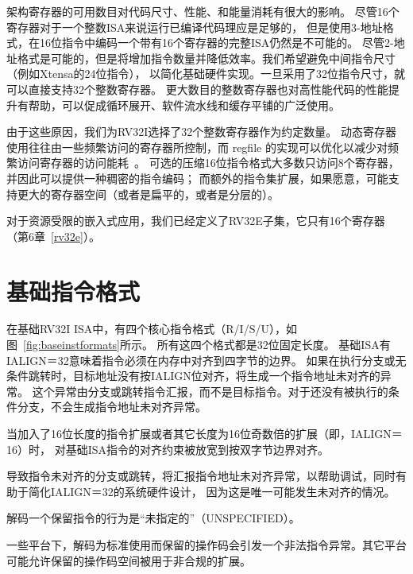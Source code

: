 \begin{commentary}

  架构寄存器的可用数目对代码尺寸、性能、和能量消耗有很大的影响。
  尽管16个寄存器对于一个整数ISA来说运行已编译代码理应是足够的，
  但是使用3-地址格式，在16位指令中编码一个带有16个寄存器的完整ISA仍然是不可能的。
  尽管2-地址格式是可能的，但是将增加指令数量并降低效率。我们希望避免中间指令尺寸（例如Xtensa的24位指令），
  以简化基础硬件实现。一旦采用了32位指令尺寸，就可以直接支持32个整数寄存器。
  更大数目的整数寄存器也对高性能代码的性能提升有帮助，可以促成循环展开、软件流水线和缓存平铺的广泛使用。

  由于这些原因，我们为RV32I选择了32个整数寄存器作为约定数量。
  动态寄存器使用往往由一些频繁访问的寄存器所控制，而 regfile 的实现可以优化以减少对频繁访问寄存器的访问能耗~\cite{jtseng:sbbci}。
  可选的压缩16位指令格式大多数只访问8个寄存器，并因此可以提供一种稠密的指令编码；
  而额外的指令集扩展，如果愿意，可能支持更大的寄存器空间（或者是扁平的，或者是分层的）。

  对于资源受限的嵌入式应用，我们已经定义了RV32E子集，它只有16个寄存器（第6章~\ref{rv32e}）。
\end{commentary}

\section{基础指令格式}

在基础RV32I ISA中，有四个核心指令格式（R/I/S/U），如图~\ref{fig:baseinstformats}所示。
所有这四个格式都是32位固定长度。
基础ISA有IALIGN＝32意味着指令必须在内存中对齐到四字节的边界。
如果在执行分支或无条件跳转时，目标地址没有按IALIGN位对齐，将生成一个指令地址未对齐的异常。
这个异常由分支或跳转指令汇报，而不是目标指令。对于还没有被执行的条件分支，不会生成指令地址未对齐异常。

\begin{commentary}

  当加入了16位长度的指令扩展或者其它长度为16位奇数倍的扩展（即，IALIGN＝16）时，
  对基础ISA指令的对齐约束被放宽到按双字节边界对齐。

  导致指令未对齐的分支或跳转，将汇报指令地址未对齐异常，以帮助调试，同时有助于简化IALIGN＝32的系统硬件设计，
  因为这是唯一可能发生未对齐的情况。
\end{commentary}

解码一个保留指令的行为是“未指定的”（UNSPECIFIED）。

\begin{commentary}
  
  一些平台下，解码为标准使用而保留的操作码会引发一个非法指令异常。其它平台可能允许保留的操作码空间被用于非合规的扩展。
\end{commentary}

